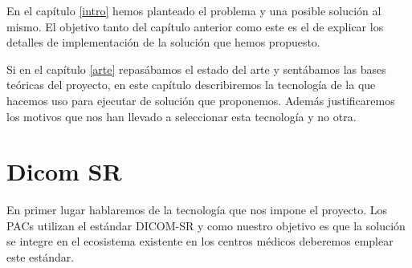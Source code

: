 En el capítulo \ref{intro} hemos planteado el problema y una posible solución al mismo. El objetivo tanto del capítulo anterior como este es el de explicar los detalles de implementación de la solución que hemos propuesto.\par 
Si en el capítulo  \ref{arte} repasábamos el estado del arte y sentábamos las bases teóricas del proyecto, en este capítulo describiremos la tecnología de la que hacemos uso para ejecutar de solución que proponemos. Además justificaremos los motivos que nos han llevado a seleccionar esta tecnología y no otra.\par

\section{Dicom SR}\label{dicomSR}
En primer lugar hablaremos de la tecnología que nos impone el proyecto. Los PACs utilizan el estándar DICOM-SR y como nuestro objetivo es que la solución se integre en el ecosistema existente en los centros médicos deberemos emplear este estándar.\medskip\par

